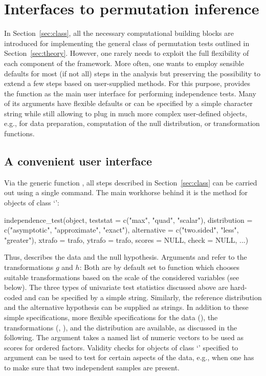 \documentclass[article]{jss}
\newcommand{\Rclass}[1]{`\code{#1}'}
\begin{document}
\section{Interfaces to permutation inference} \label{sec:ui}

In Section~\ref{sec:class}, all the necessary computational building blocks are
introduced for implementing the general class of permutation tests outlined
in Section~\ref{sec:theory}. However, one rarely needs to exploit the full
flexibility of each component of the framework. More often, one wants to employ
sensible defaults for most (if not all) steps in the analysis but preserving
the possibility to extend a few steps based on user-supplied methods.
For this purpose,  provides the function 
as the main user interface for performing independence tests. Many of its arguments
have flexible defaults or can be specified by a simple character string while
still allowing to plug in much more complex user-defined objects, e.g., for 
data preparation, computation of the null distribution, or transformation functions.

\subsection{A convenient user interface}

Via the generic function , all steps described
in Section~\ref{sec:class} can be carried out using a single command.
The main workhorse behind it is the method for objects of class
\Rclass{IndependenceProblem}:
\begin{Sinput}
independence_test(object, 
  teststat = c("max", "quad", "scalar"),
  distribution = c("asymptotic", "approximate", "exact"),
  alternative = c("two.sided", "less", "greater"),
  xtrafo = trafo, ytrafo = trafo, scores = NULL, 
  check = NULL, ...)
\end{Sinput}
Thus,  describes the data and the null hypothesis. Arguments
 and  refer to the transformations $g$ and $h$: Both are
by default set to function  which chooses suitable transformations
based on the scale of the considered variables (see below). 
The three types of univariate test statistics discussed above are hard-coded and can be specified by 
a simple string. Similarly, the reference distribution and the alternative hypothesis
can be supplied as strings. In addition to these simple specifications, more flexible
specifications for the data (), the transformations (, ),
and the distribution are available, as discussed in the following. The 
argument takes a named list of numeric vectors to be used as scores for ordered
factors. Validity checks for objects of class \Rclass{IndependenceProblem} specified
to argument  can be used to test for certain aspects of the data, e.g.,
when one has to make sure that two independent samples are present.
\end{document}
